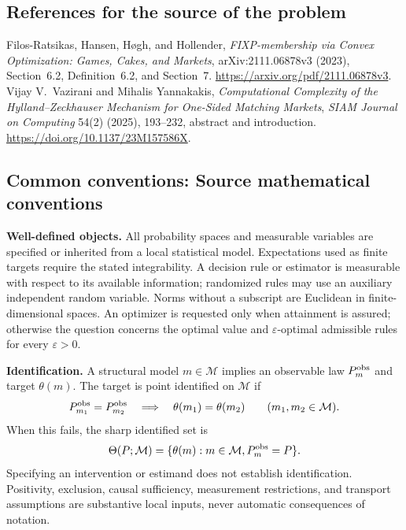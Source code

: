 \documentclass[11pt,a4paper]{article}
\begin{document}
\subsection*{References for the source of the problem}
Filos-Ratsikas, Hansen, H\o gh, and Hollender, \emph{FIXP-membership via Convex Optimization: Games, Cakes, and Markets}, arXiv:2111.06878v3 (2023), Section~6.2, Definition~6.2, and Section~7. \url{https://arxiv.org/pdf/2111.06878v3}. Vijay V.~Vazirani and Mihalis Yannakakis, \emph{Computational Complexity of the Hylland--Zeckhauser Mechanism for One-Sided Matching Markets}, \emph{SIAM Journal on Computing} 54(2) (2025), 193--232, abstract and introduction. \url{https://doi.org/10.1137/23M157586X}.

\subsection*{Common conventions: Source mathematical conventions}

\textbf{Well-defined objects.}
All probability spaces and measurable variables are specified or inherited
from a local statistical model. Expectations used as finite targets require
the stated integrability. A decision rule or estimator is measurable with
respect to its available information; randomized rules may use an auxiliary
independent random variable. Norms without a subscript are Euclidean in
finite-dimensional spaces. An optimizer is requested only when attainment
is assured; otherwise the question concerns the optimal value and
$\varepsilon$-optimal admissible rules for every $\varepsilon>0$.

\textbf{Identification.}
A structural model $m\in\mathcal M$ implies an observable law
$P_m^{\rm obs}$ and target $\theta(m)$. The target is point identified on
$\mathcal M$ if
\[
 P_{m_1}^{\rm obs}=P_{m_2}^{\rm obs}
 \quad\Longrightarrow\quad\theta(m_1)=\theta(m_2)
 \qquad(m_1,m_2\in\mathcal M).
\]
When this fails, the sharp identified set is
\[
 \Theta(P;\mathcal M)=\{\theta(m):m\in\mathcal M,
                                  P_m^{\rm obs}=P\}.
\]
Specifying an intervention or estimand does not establish identification.
Positivity, exclusion, causal sufficiency, measurement restrictions, and
transport assumptions are substantive local inputs, never automatic
consequences of notation.
\end{document}
